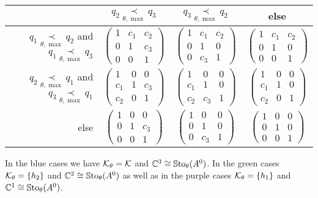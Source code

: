 \begin{center}
  \def\arraystretch{1.3}
  \setlength\tabcolsep{4mm}
  \begin{tabular}{r|c|c|c}
    & $q_2 \underset{\theta,\max}{\prec} q_3$
    & $q_3 \underset{\theta,\max}{\prec} q_2$
    & else
    \tabularnewline
    \hline
    $q_1 \underset{\theta,\max}{\prec} q_2$ and
    $q_1 \underset{\theta,\max}{\prec} q_3$
    & $\begin{pmatrix} 1 & c_1 & c_2 \\0 & 1 & c_3 \\0 & 0 & 1 \end{pmatrix}$
   \cellcolor{blue!15}
    & $\begin{pmatrix} 1 & c_1 & c_2 \\0 & 1 & 0 \\0 & c_3 & 1 \end{pmatrix}$
   \cellcolor{blue!15}
    & $\begin{pmatrix} 1 & c_1 & c_2 \\0 & 1 & 0 \\0 & 0 & 1 \end{pmatrix}$
   \cellcolor{green!15}
    \tabularnewline
    \hline
    $q_2 \underset{\theta,\max}{\prec} q_1$ and
    $q_3 \underset{\theta,\max}{\prec} q_1$
    & $\begin{pmatrix} 1 & 0 & 0 \\c_1 & 1 & c_3 \\c_2 & 0 & 1 \end{pmatrix}$
   \cellcolor{blue!15}
    & $\begin{pmatrix} 1 & 0 & 0 \\c_1 & 1 & 0 \\c_2 & c_3 & 1 \end{pmatrix}$
   \cellcolor{blue!15}
    & $\begin{pmatrix} 1 & 0 & 0 \\c_1 & 1 & 0 \\c_2 & 0 & 1 \end{pmatrix}$
   \cellcolor{green!15}
    \tabularnewline
    \hline
    else
    & $\begin{pmatrix} 1 & 0 & 0 \\0 & 1 & c_3 \\0 & 0 & 1 \end{pmatrix}$
   \cellcolor{purple!15}
    & $\begin{pmatrix} 1 & 0 & 0 \\0 & 1 & 0 \\0 & c_3 & 1 \end{pmatrix}$
   \cellcolor{purple!15}
    & $\begin{pmatrix} 1 & 0 & 0 \\0 & 1 & 0 \\0 & 0 & 1 \end{pmatrix}$
  \end{tabular}
\end{center}
In the \textcolor{blue!75!black}{blue} cases we have $\mathcal{K}_\theta=\mathcal{K}$ and
$\mathbb{C}^3\cong\operatorname{\mathbb{S}to}_\theta(A^0)$.
In the \textcolor{green!75!black}{green} cases $\mathcal{K}_\theta=\{h_2\}$ and
$\mathbb{C}^2\cong\operatorname{\mathbb{S}to}_\theta(A^0)$ as well as in the
\textcolor{purple!75!black}{purple} cases $\mathcal{K}_\theta=\{h_1\}$ and
$\mathbb{C}^1\cong\operatorname{\mathbb{S}to}_\theta(A^0)$.


